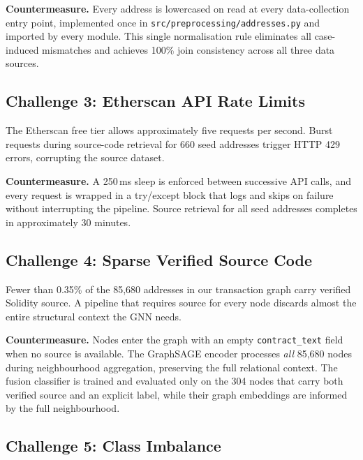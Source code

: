 \textbf{Countermeasure.}
Every address is lowercased on read at every data-collection entry
point, implemented once in \texttt{src/preprocessing/addresses.py} and
imported by every module.  This single normalisation rule eliminates all
case-induced mismatches and achieves 100\% join consistency across all
three data sources.

\subsection{Challenge 3: Etherscan API Rate Limits}

The Etherscan free tier allows approximately five requests per second.
Burst requests during source-code retrieval for 660 seed addresses
trigger HTTP 429 errors, corrupting the source dataset.

\textbf{Countermeasure.}
A 250\,ms sleep is enforced between successive API calls, and every
request is wrapped in a try/except block that logs and skips on failure
without interrupting the pipeline.  Source retrieval for all seed
addresses completes in approximately 30 minutes.

\subsection{Challenge 4: Sparse Verified Source Code}

Fewer than 0.35\% of the 85,680 addresses in our transaction graph
carry verified Solidity source.  A pipeline that requires source for
every node discards almost the entire structural context the GNN needs.

\textbf{Countermeasure.}
Nodes enter the graph with an empty \texttt{contract\_text} field when
no source is available.  The GraphSAGE encoder processes \emph{all}
85,680 nodes during neighbourhood aggregation, preserving the full
relational context.  The fusion classifier is trained and evaluated only
on the 304 nodes that carry both verified source and an explicit label,
while their graph embeddings are informed by the full neighbourhood.

\subsection{Challenge 5: Class Imbalance}

